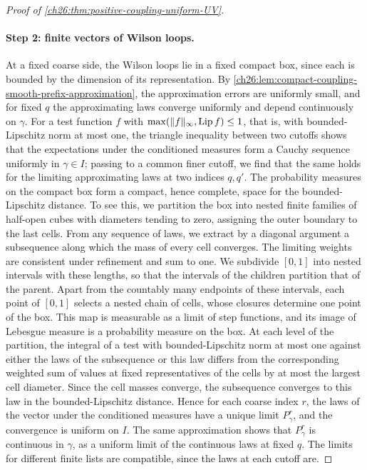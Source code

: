 \begin{proof}[Proof of \cref{ch26:thm:positive-coupling-uniform-UV}]
\paragraph{Step 2: finite vectors of Wilson loops.}
At a fixed coarse side, the Wilson loops lie in a fixed compact box, since each is bounded by the dimension of its representation. By \cref{ch26:lem:compact-coupling-smooth-prefix-approximation}, the approximation errors are uniformly small, and for fixed $q$ the approximating laws converge uniformly and depend continuously on $\gamma$. For a test function $f$ with $\max(\lVert f\rVert_\infty,\operatorname{Lip} f)\le1$, that is, with bounded-Lipschitz norm at most one, the triangle inequality between two cutoffs shows that the expectations under the conditioned measures form a Cauchy sequence uniformly in $\gamma\in I$; passing to a common finer cutoff, we find that the same holds for the limiting approximating laws at two indices $q,q'$. The probability measures on the compact box form a compact, hence complete, space for the bounded-Lipschitz distance. To see this, we partition the box into nested finite families of half-open cubes with diameters tending to zero, assigning the outer boundary to the last cells. From any sequence of laws, we extract by a diagonal argument a subsequence along which the mass of every cell converges. The limiting weights are consistent under refinement and sum to one. We subdivide $[0,1]$ into nested intervals with these lengths, so that the intervals of the children partition that of the parent. Apart from the countably many endpoints of these intervals, each point of $[0,1]$ selects a nested chain of cells, whose closures determine one point of the box. This map is measurable as a limit of step functions, and its image of Lebesgue measure is a probability measure on the box. At each level of the partition, the integral of a test with bounded-Lipschitz norm at most one against either the laws of the subsequence or this law differs from the corresponding weighted sum of values at fixed representatives of the cells by at most the largest cell diameter. Since the cell masses converge, the subsequence converges to this law in the bounded-Lipschitz distance. Hence for each coarse index $r$, the laws of the vector under the conditioned measures have a unique limit $P^r_\gamma$, and the convergence is uniform on $I$. The same approximation shows that $P^r_\gamma$ is continuous in $\gamma$, as a uniform limit of the continuous laws at fixed $q$. The limits for different finite lists are compatible, since the laws at each cutoff are.


\end{proof}
